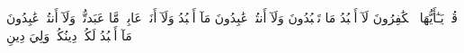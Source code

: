قُلۡ يَـٰٓأَيُّهَا ٱلۡكَٰفِرُونَ
لَآ أَعۡبُدُ مَا تَعۡبُدُونَ
وَلَآ أَنتُمۡ عَٰبِدُونَ مَآ أَعۡبُدُ
وَلَآ أَنَا۠ عَابِدٞ مَّا عَبَدتُّمۡ
وَلَآ أَنتُمۡ عَٰبِدُونَ مَآ أَعۡبُدُ
لَكُمۡ دِينُكُمۡ وَلِيَ دِينِ